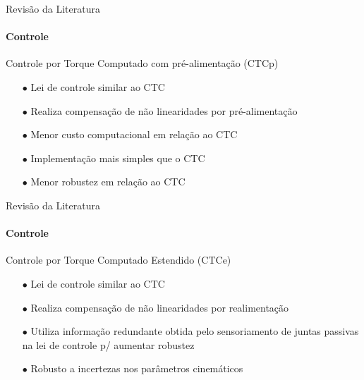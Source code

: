 \documentclass[25pt,landscape]{beamer}
\begin{document}
\begin{frame}{Revisão da Literatura}
    \framesubtitle{Controle}
    \begin{block}{Controle por Torque Computado com pré-alimentação (CTCp)}
        \begin{itemize}
            \item[$\bullet$] Lei de controle similar ao CTC \\[8pt]
            \item[$\bullet$] Realiza compensação de não linearidades por pré-alimentação \\[8pt]
            \item[$\bullet$] Menor custo computacional em relação ao CTC \\[8pt]
            \item[$\bullet$] Implementação mais simples que o CTC \\[8pt]
            \item[$\bullet$] Menor robustez em relação ao CTC \\[8pt]
        \end{itemize}
    \end{block}
\end{frame}

\begin{frame}{Revisão da Literatura}
    \framesubtitle{Controle}
    \begin{block}{Controle por Torque Computado Estendido (CTCe)}
        \begin{itemize}
            \item[$\bullet$] Lei de controle similar ao CTC \\[8pt]
            \item[$\bullet$] Realiza compensação de não linearidades por realimentação \\[8pt]
            \item[$\bullet$] Utiliza informação redundante obtida pelo sensoriamento de juntas passivas na lei de controle p/ aumentar robustez \\[8pt]
            \item[$\bullet$] Robusto a incertezas nos parâmetros cinemáticos \\[8pt]
        \end{itemize}
    \end{block}
\end{frame}
\end{document}
